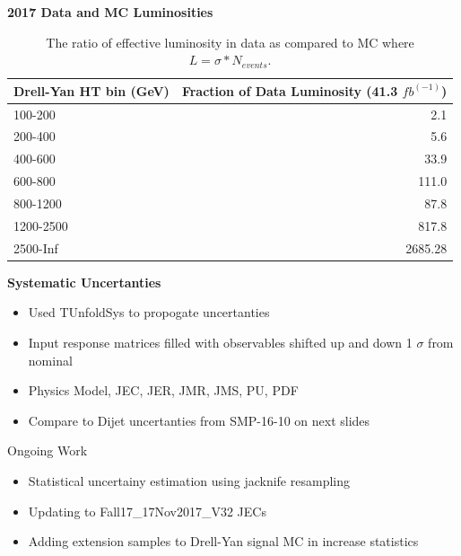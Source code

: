 \documentclass{beamer}
\begin{document}
\begin{frame}{\textbf{2017 Data and MC Luminosities}}

 \begin{table}
\centering
\begin{tabular}{l|r}
Drell-Yan HT bin (GeV) & Fraction of Data Luminosity (41.3 $fb^(-1)$)\\\hline
100-200 & 2.1 \\
200-400 & 5.6 \\
400-600 & 33.9 \\
600-800 & 111.0 \\
800-1200 & 87.8 \\
1200-2500 & 817.8 \\
2500-Inf & 2685.28 \\


\end{tabular}
\caption{\label{tab:datamclumi} The ratio of effective luminosity in data as compared to MC where $ L = \sigma * N_{events}$.}
\end{table}
 
 



\end{frame}
\begin{frame}{\textbf{Systematic Uncertanties}}
\begin{itemize}
  \item Used TUnfoldSys to propogate uncertanties 
  \item Input response matrices filled with observables shifted up and down 1 $\sigma$ from nominal 
  \item  Physics Model, JEC, JER, JMR, JMS, PU, PDF
  \item Compare to Dijet uncertanties from SMP-16-10 on next slides
\end{itemize}

\begin{block}{Ongoing Work}
\begin{itemize}
  \item Statistical uncertainy estimation using jacknife resampling
  \item Updating to Fall17\_17Nov2017\_V32 JECs 
  \item Adding extension samples to Drell-Yan signal MC in increase statistics
\end{itemize}

\end{block}


\end{frame}
\end{document}
